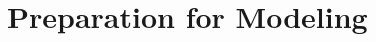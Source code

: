 \documentclass[12pt]{article}
\begin{document}













\section{Preparation for Modeling}
\end{document}
